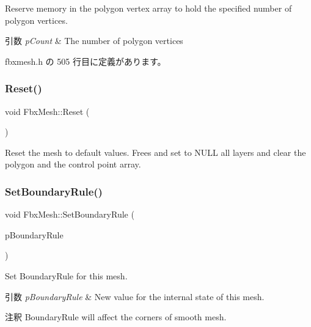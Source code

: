 Reserve memory in the polygon vertex array to hold the specified number of polygon vertices. 
\begin{DoxyParams}{引数}
{\em p\+Count} & The number of polygon vertices \\
\hline
\end{DoxyParams}


 fbxmesh.\+h の 505 行目に定義があります。

\mbox{\label{class_fbx_mesh_addb08ad4590a4fcdaf575dbf16c490fd}} 
\subsubsection{\texorpdfstring{Reset()}{Reset()}}
{\footnotesize\ttfamily void Fbx\+Mesh\+::\+Reset (\begin{DoxyParamCaption}{ }\end{DoxyParamCaption})}

Reset the mesh to default values. Frees and set to {\ttfamily N\+U\+LL} all layers and clear the polygon and the control point array. \mbox{\label{class_fbx_mesh_a36ab48a31065c607af8ad8a554fab6c6}} 
\subsubsection{\texorpdfstring{Set\+Boundary\+Rule()}{SetBoundaryRule()}}
{\footnotesize\ttfamily void Fbx\+Mesh\+::\+Set\+Boundary\+Rule (\begin{DoxyParamCaption}\item[{\hyperlink{class_fbx_mesh_ab9e7d41ffcd49467a374c72e0d6f3561}{E\+Boundary\+Rule}}]{p\+Boundary\+Rule }\end{DoxyParamCaption})}

Set Boundary\+Rule for this mesh. 
\begin{DoxyParams}{引数}
{\em p\+Boundary\+Rule} & New value for the internal state of this mesh. \\
\hline
\end{DoxyParams}
\begin{DoxyRemark}{注釈}
Boundary\+Rule will affect the corners of smooth mesh. 
\end{DoxyRemark}
\mbox{\label{class_fbx_mesh_ae9cf093a067ebc761231f1f186695d67}} 
